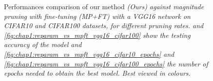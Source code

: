 \begin{figure}

    
  \caption{ Performances comparison of our method \em{(Ours)} against
  magnitude pruning with fine-tuning \em{(MP+FT)} with a VGG16 network on
  CIFAR10 and CIFAR100 datasets, for different pruning rates.
   and
  \cref{fig:chap1:reparam_vs_mpft_vgg16_cifar100} show the testing accuracy of
  the model and \cref{fig:chap1:reparam_vs_mpft_vgg16_cifar10_epochs} and
  \cref{fig:chap1:reparam_vs_mpft_vgg16_cifar100_epochs} the
  number of epochs needed to obtain the best model. Best viewed in colours.}
  \label{fig:chap1:reparam_vs_mpft_vgg16}
\end{figure}

